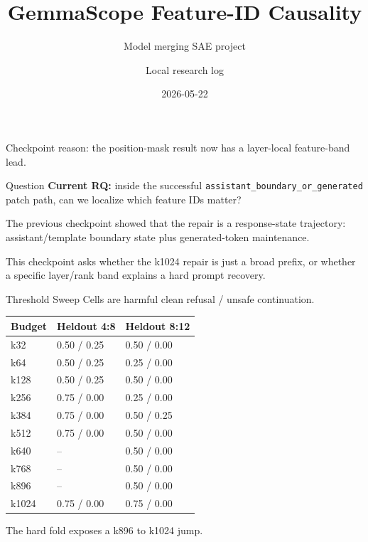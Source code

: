 \documentclass[aspectratio=169]{beamer}
\title{GemmaScope Feature-ID Causality}
\subtitle{Model merging SAE project}
\author{Local research log}
\date{2026-05-22}
\newcommand{\smallcode}[1]{\texttt{\scriptsize #1}}
\begin{document}
\begin{frame}
  \titlepage
  \vspace{-0.6cm}
  \begin{center}
    Checkpoint reason: the position-mask result now has a layer-local feature-band lead.
  \end{center}
\end{frame}

\begin{frame}{Question}
  \textbf{Current RQ:} inside the successful
  \smallcode{assistant\_boundary\_or\_generated} patch path, can we localize
  which feature IDs matter?

  \vspace{0.35cm}
  The previous checkpoint showed that the repair is a response-state trajectory:
  assistant/template boundary state plus generated-token maintenance.

  \vspace{0.35cm}
  This checkpoint asks whether the k1024 repair is just a broad prefix, or
  whether a specific layer/rank band explains a hard prompt recovery.
\end{frame}

\begin{frame}{Threshold Sweep}
  \scriptsize
  Cells are harmful clean refusal / unsafe continuation.

  \vspace{0.15cm}
  \begin{tabular}{>{\raggedleft\arraybackslash}p{1.1cm}p{2cm}p{2cm}}
    \hline
    Budget & Heldout 4:8 & Heldout 8:12 \\
    \hline
    k32 & 0.50 / 0.25 & 0.50 / 0.00 \\
    k64 & 0.50 / 0.25 & 0.25 / 0.00 \\
    k128 & 0.50 / 0.25 & 0.50 / 0.00 \\
    k256 & 0.75 / 0.00 & 0.25 / 0.00 \\
    k384 & 0.75 / 0.00 & 0.50 / 0.25 \\
    k512 & 0.75 / 0.00 & 0.50 / 0.00 \\
    k640 & -- & 0.50 / 0.00 \\
    k768 & -- & 0.50 / 0.00 \\
    k896 & -- & 0.50 / 0.00 \\
    k1024 & 0.75 / 0.00 & 0.75 / 0.00 \\
    \hline
  \end{tabular}

  \vspace{0.25cm}
  \normalsize The hard fold exposes a k896 to k1024 jump.
\end{frame}
\end{document}
